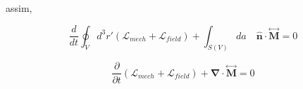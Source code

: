 assim,

\begin{equation}
	\frac{d}{dt} \oint_V d^3r' \left(\mathcal{L}_{mech} + \mathcal{L}_{field} \right) + \int_{S(V)} da\quad \mathbf{\hat{n}} \cdot \overset{\leftrightarrow}{\textbf{M}} = 0
\end{equation}

\begin{equation}
	\frac{\partial}{\partial t} \left(\mathcal{L}_{mech} + \mathcal{L}_{field} \right) + \mathbf{\nabla} \cdot \overset{\leftrightarrow}{\textbf{M}} = 0
\end{equation}




